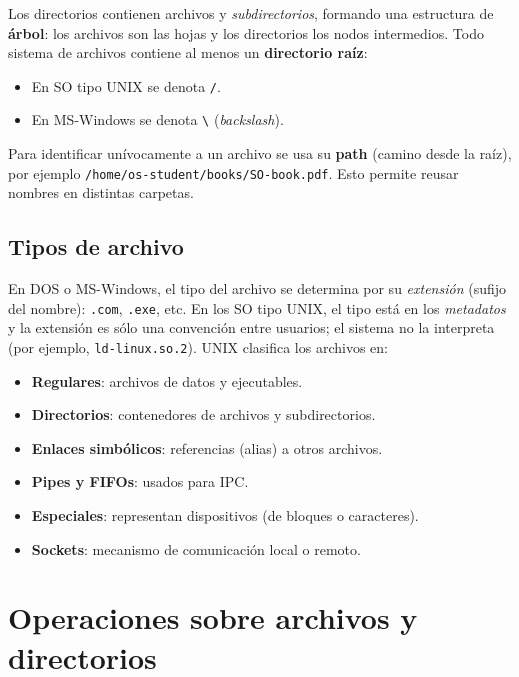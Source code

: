 \documentclass[11pt,a4paper]{article}
\begin{document}
Los directorios contienen archivos y \emph{subdirectorios}, formando
una estructura de \textbf{árbol}: los archivos son las hojas y los
directorios los nodos intermedios. Todo sistema de archivos contiene
al menos un \textbf{directorio raíz}:

\begin{itemize}[leftmargin=*,nosep]
    \item En SO tipo UNIX se denota \texttt{/}.
    \item En MS-Windows se denota \texttt{\textbackslash}
        (\emph{backslash}).
\end{itemize}

Para identificar unívocamente a un archivo se usa su \textbf{path}
(camino desde la raíz), por ejemplo
\verb|/home/os-student/books/SO-book.pdf|. Esto permite reusar nombres
en distintas carpetas.

\subsection{Tipos de archivo}

En DOS o MS-Windows, el tipo del archivo se determina por su
\emph{extensión} (sufijo del nombre): \verb|.com|, \verb|.exe|, etc.
En los SO tipo UNIX, el tipo está en los \emph{metadatos} y la
extensión es sólo una convención entre usuarios; el sistema no la
interpreta (por ejemplo, \verb|ld-linux.so.2|). UNIX clasifica los
archivos en:

\begin{itemize}[leftmargin=*]
    \item \textbf{Regulares}: archivos de datos y ejecutables.
    \item \textbf{Directorios}: contenedores de archivos y
        subdirectorios.
    \item \textbf{Enlaces simbólicos}: referencias (alias) a otros
        archivos.
    \item \textbf{Pipes y FIFOs}: usados para IPC.
    \item \textbf{Especiales}: representan dispositivos (de bloques o
        caracteres).
    \item \textbf{Sockets}: mecanismo de comunicación local o remoto.
\end{itemize}

\section{Operaciones sobre archivos y directorios}
\end{document}
